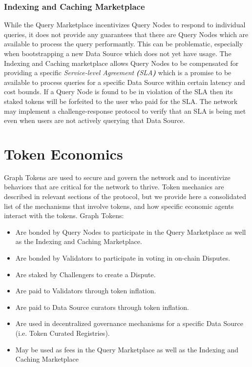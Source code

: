 \documentclass[12pt]{article}
\begin{document}
\subsubsection*{Indexing and Caching Marketplace}

While the Query Marketplace incentivizes Query Nodes to respond to individual
queries, it does not provide any guarantees that there are Query Nodes which are
available to process the query performantly. This can be problematic, especially
when bootstrapping a new Data Source which does not yet have usage. The Indexing
and Caching marketplace allows Query Nodes to be compensated for providing a
specific \textit{Service-level Agreement}
\textbf{\textit{(}}\textit{SLA}\textbf{\textit{)}} which is a promise to be
available to process queries for a specific Data Source within certain latency
and cost bounds. If a Query Node is found to be in violation of the SLA then its
staked tokens will be forfeited to the user who paid for the SLA. The network
may implement a challenge-response protocol to verify that an SLA is being met
even when users are not actively querying that Data Source.

\section{Token Economics}

Graph Tokens are used to secure and govern the network and to incentivize
behaviors that are critical for the network to thrive. Token mechanics are
described in relevant sections of the protocol, but we provide here a
consolidated list of the mechanisms that involve tokens, and how specific
economic agents interact with the tokens. Graph Tokens:

\begin{itemize}
\item Are bonded by Query Nodes to participate in the Query Marketplace as well
  as the Indexing and Caching Marketplace.
\item Are bonded by Validators to participate in voting in on-chain Disputes.
\item Are staked by Challengers to create a Dispute.
\item Are paid to Validators through token inflation.
\item Are paid to Data Source curators through token inflation.
\item Are used in decentralized governance mechanisms for a specific Data Source
  (i.e. Token Curated Registries).
\item May be used as fees in the Query Marketplace as well as the Indexing and
  Caching Marketplace
\end{itemize}
\end{document}
